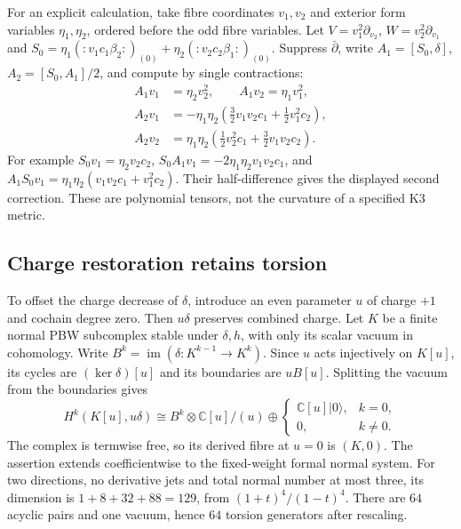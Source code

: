 For an explicit calculation, take fibre
coordinates $v_1,v_2$ and exterior form
variables $\eta_1,\eta_2$, ordered before
the odd fibre variables. Let
$V=v_1^2\partial_{v_2}$,
$W=v_2^2\partial_{v_1}$ and
$S_0=\eta_1(:v_1c_1\beta_2:)_{(0)}
+\eta_2(:v_2c_2\beta_1:)_{(0)}$.
Suppress $\bar\partial$, write
$A_1=[S_0,\delta]$, $A_2=[S_0,A_1]/2$,
and compute by single contractions:
\[
\begin{split}
 A_1v_1&=\eta_2v_2^2,\qquad A_1v_2=\eta_1v_1^2,\\
 A_2v_1&=-\eta_1\eta_2
       \left(\tfrac32v_1v_2c_1+\tfrac12v_1^2c_2\right),\\
 A_2v_2&=\eta_1\eta_2
       \left(\tfrac12v_2^2c_1+\tfrac32v_1v_2c_2\right).
\end{split}
\]
For example $S_0v_1=\eta_2v_2c_2$,
$S_0A_1v_1=-2\eta_1\eta_2v_1v_2c_1$, and
$A_1S_0v_1=\eta_1\eta_2(v_1v_2c_1+v_1^2c_2)$.
Their half-difference gives the displayed
second correction. These are polynomial
tensors, not the curvature of a specified
K3 metric.

\subsection{Charge restoration retains torsion}

To offset the charge decrease of $\delta$,
introduce an even parameter $u$ of charge
$+1$ and cochain degree zero. Then $u\delta$
preserves combined charge. Let $K$ be a
finite normal PBW subcomplex stable under
$\delta,h$, with only its scalar vacuum
in cohomology. Write $B^k=\operatorname{im}
(\delta:K^{k-1}\to K^k)$. Since $u$ acts
injectively on $K[u]$, its cycles are
$(\ker\delta)[u]$ and its boundaries are
$uB[u]$. Splitting the vacuum from the
boundaries gives
\begin{equation}\label{cyprim:eq:charge-torsion}
 H^k(K[u],u\delta)\cong
 B^k\otimes\mathbb C[u]/(u)
 \oplus\begin{cases}\mathbb C[u]|0\rangle,&k=0,\\0,&k\ne0.
 \end{cases}
\end{equation}
The complex is termwise free, so its derived
fibre at $u=0$ is $(K,0)$. The assertion
extends coefficientwise to the fixed-weight
formal normal system. For two directions,
no derivative jets and total normal number
at most three, its dimension is
$1+8+32+88=129$, from $(1+t)^4/(1-t)^4$.
There are $64$ acyclic pairs and one vacuum,
hence $64$ torsion generators after rescaling.

